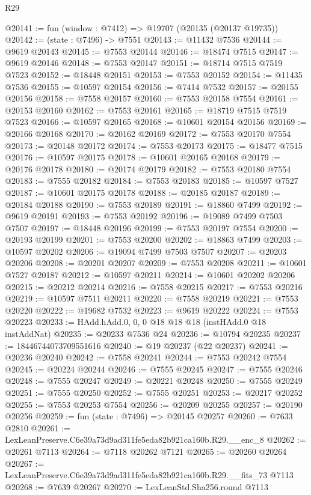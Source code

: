 \begin{lexlean}{R29}
\begin{coremodule}
@20141 := fun (window : @7412) => @19707 (@20135 (@20137 @19735))
@20142 := (state : @7496) -> @7551
@20143 := @11432 @7536
@20144 := @9619 @20143
@20145 := @7553 @20144
@20146 := @18474 @7515
@20147 := @9619 @20146
@20148 := @7553 @20147
@20151 := @18714 @7515 @7519 @7523
@20152 := @18448 @20151
@20153 := @7553 @20152
@20154 := @11435 @7536
@20155 := @10597 @20154
@20156 := @7414 @7532
@20157 := @20155 @20156
@20158 := @7558 @20157
@20160 := @7553 @20158 @7554
@20161 := @20153 @20160
@20162 := @7553 @20161
@20165 := @18719 @7515 @7519 @7523
@20166 := @10597 @20165
@20168 := @10601 @20154 @20156
@20169 := @20166 @20168
@20170 := @20162 @20169
@20172 := @7553 @20170 @7554
@20173 := @20148 @20172
@20174 := @7553 @20173
@20175 := @18477 @7515
@20176 := @10597 @20175
@20178 := @10601 @20165 @20168
@20179 := @20176 @20178
@20180 := @20174 @20179
@20182 := @7553 @20180 @7554
@20183 := @7555 @20182
@20184 := @7553 @20183
@20185 := @10597 @7527
@20187 := @10601 @20175 @20178
@20188 := @20185 @20187
@20189 := @20184 @20188
@20190 := @7553 @20189
@20191 := @18860 @7499
@20192 := @9619 @20191
@20193 := @7553 @20192
@20196 := @19089 @7499 @7503 @7507
@20197 := @18448 @20196
@20199 := @7553 @20197 @7554
@20200 := @20193 @20199
@20201 := @7553 @20200
@20202 := @18863 @7499
@20203 := @10597 @20202
@20206 := @19094 @7499 @7503 @7507
@20207 := @20203 @20206
@20208 := @20201 @20207
@20209 := @7553 @20208
@20211 := @10601 @7527 @20187
@20212 := @10597 @20211
@20214 := @10601 @20202 @20206
@20215 := @20212 @20214
@20216 := @7558 @20215
@20217 := @7553 @20216
@20219 := @10597 @7511 @20211
@20220 := @7558 @20219
@20221 := @7553 @20220
@20222 := @19682 @7532
@20223 := @9619 @20222
@20224 := @7553 @20223
@20233 := HAdd.hAdd.{0, 0, 0} @18 @18 @18 (instHAdd.{0} @18 instAddNat)
@20235 := @20233 @7536 @24
@20236 := @10794 @20235
@20237 := 18446744073709551616
@20240 := @19 @20237 (@22 @20237)
@20241 := @20236 @20240
@20242 := @7558 @20241
@20244 := @7553 @20242 @7554
@20245 := @20224 @20244
@20246 := @7555 @20245
@20247 := @7555 @20246
@20248 := @7555 @20247
@20249 := @20221 @20248
@20250 := @7555 @20249
@20251 := @7555 @20250
@20252 := @7555 @20251
@20253 := @20217 @20252
@20255 := @7553 @20253 @7554
@20256 := @20209 @20255
@20257 := @20190 @20256
@20259 := fun (state : @7496) => @20145 @20257
@20260 := @7633 @2810
@20261 := LexLeanPreserve.C6e39a73d9ad311fe5eda82b921ca160b.R29.__enc_8
@20262 := @20261 @7113
@20264 := @7118 @20262 @7121
@20265 := @20260 @20264
@20267 := LexLeanPreserve.C6e39a73d9ad311fe5eda82b921ca160b.R29.__fits_73 @7113
@20268 := @7639 @20267
@20270 := LexLeanStd.Sha256.round @7113

\end{coremodule}
\end{lexlean}
